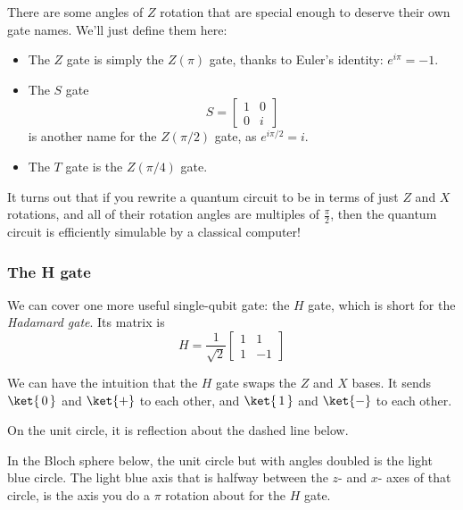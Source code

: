 \documentclass{article}
\theoremstyle{definition}
\newcommand{\kz}[1]{\ket{\,#1\,}}
\newcommand{\kx}[1]{\ket{#1}}
\begin{document}
There are some angles of $Z$ rotation that are special enough to deserve their own gate names.
We'll just define them here:
\begin{itemize}
	\item The $Z$ gate is simply the $Z(\pi)$ gate, thanks to Euler's identity: $e^{i\pi} = -1$.
	\item The $S$ gate \begin{equation}
		S = \begin{bmatrix}
			1 & 0\\
			0 & i
		\end{bmatrix}
	\end{equation} is another name for the $Z(\pi/2)$ gate, as $e^{i\pi/2} = i$.
	\item The $T$ gate is the $Z(\pi/4)$ gate.
\end{itemize}
It turns out that if you rewrite a quantum circuit to be in terms of just $Z$ and $X$ rotations, and all of their rotation angles are multiples of $\frac{\pi}{2}$, then the quantum circuit is efficiently simulable by a classical computer!

\newpage
\subsubsection{The H gate}
We can cover one more useful single-qubit gate: the $H$ gate, which is short for the \textit{Hadamard gate}.  Its matrix is
\begin{equation}
	H = \frac{1}{\sqrt{2}}\begin{bmatrix}
		1 & 1\\
		1 & -1
	\end{bmatrix}
\end{equation}

We can have the intuition that the $H$ gate swaps the $Z$ and $X$ bases.
It sends $\kz0$ and $\kx+$ to each other, and $\kz1$ and $\kx-$ to each other.

On the unit circle, it is reflection about the dashed line below.
\begin{figure}[H]
	\label{fig:Hgate}
\end{figure}

In the Bloch sphere below, the unit circle but with angles doubled is the light blue circle.
The light blue axis that is halfway between the $z$- and $x$- axes of that circle, is the axis you do a $\pi$ rotation about for the $H$ gate.
\begin{figure}[H]
\end{figure}
\end{document}
